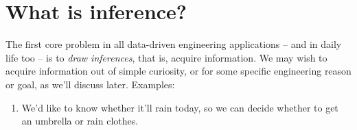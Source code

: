 \documentclass[
  a4paper,
  DIV=11,
  numbers=noendperiod,
  oneside]{scrreprt}
\providecommand{\tightlist}{%
  \setlength{\itemsep}{0pt}\setlength{\parskip}{0pt}}\usepackage{longtable,booktabs,array}
\begin{document}
\providecommand{\ul}{\uline}
\renewcommand*{\|}[1][]{\nonscript\:#1\vert\nonscript\:\mathopen{}}
\providecommand*{\pr}[1]{\textsf{\small`#1'}}
\renewcommand*{\pr}[1]{\textsf{\small`#1'}}
\providecommand*{\prq}[1]{\textsf{\small #1}}
\renewcommand*{\prq}[1]{\textsf{\small #1}}
\providecommand{\se}[1]{\mathsfit{#1}}
\renewcommand{\se}[1]{\mathsfit{#1}}
\providecommand{\p}{\mathrm{p}}
\renewcommand{\p}{\mathrm{p}}
\renewcommand{\P}{\mathrm{P}}

\hypertarget{what-is-inference}{%
\section{What is inference?}\label{what-is-inference}}

The first core problem in all data-driven engineering applications --
and in daily life too -- is to \emph{draw inferences}, that is, acquire
information. We may wish to acquire information out of simple curiosity,
or for some specific engineering reason or goal, as we'll discuss later.
Examples:

\begin{enumerate}
\def\labelenumi{\arabic{enumi}.}
\tightlist
\item
  We'd like to know whether it'll rain today, so we can decide whether
  to get an umbrella or rain clothes.
\end{enumerate}
\end{document}
